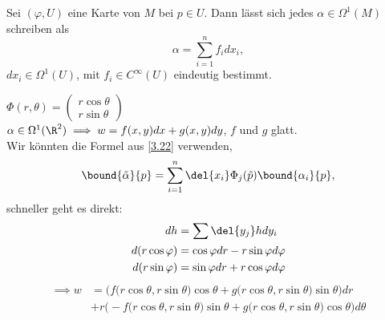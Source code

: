 \begin{lem}
	Sei $ (\varphi,U) $ eine Karte von $M$ bei $p \in U$. Dann lässt sich jedes $ \alpha \in \Omega^1(M) $ schreiben als
	\[ \alpha = \sum_{i=1}^n f_i d x_i, \]
	$dx_i \in \Omega^1(U)$, mit $f_i \in C^\infty(U)$ eindeutig bestimmt.
\end{lem}

\begin{exmp*}
	$ \Phi(r,\theta) = \begin{pmatrix}
		r\cos\theta\\ r \sin\theta
	\end{pmatrix} $\\
	$\alpha \in \Omega^1(\R^2) \implies w = f(x,y)dx + g(x,y)dy$, $f$ und $g$ glatt.\\
	Wir könnten die Formel aus \ref{3.22} verwenden,
	\[ \bound{\tilde{\alpha}}{p} = \sum_{i=1}^n \del{x_i} \Phi_j (\hat{p}) \bound{\alpha_i}{p}, \]
	schneller geht es direkt:
	\begin{align*}
		dh &= \sum \del{y_j} h dy_i\\
		d(r\cos\varphi) &= \cos\varphi dr - r \sin\varphi d\varphi\\
		d(r\sin\varphi) &= \sin\varphi dr + r \cos\varphi d\varphi
	\end{align*}
	\begin{align*}
		\implies w &= \Big(f \big(r\cos\theta,r\sin\theta \big)\cos\theta + g \big(r\cos\theta,r\sin\theta \big)\sin\theta\Big) dr\\
		&+ r\Big(-f \big(r\cos\theta,r\sin\theta \big)\sin\theta + g \big(r\cos\theta,r\sin\theta \big)\cos\theta\Big) d\theta
	\end{align*} 
\end{exmp*}